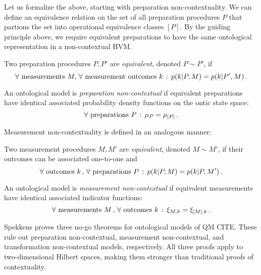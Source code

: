 Let us formalize the above, starting with preparation non-contextuality. We can define an equivalence relation on the set of all preparation procedures $P$ that partions the set into operational equivalence classes $[P]$. By the guiding principle above, we require equivalent preparations to have the same ontological representation in a non-contextual HVM.

\begin{definition}[CITE]\hfill\break
\label{def:prepnc}
Two preparation procedures $P,P'$ are \emph{equivalent}, denoted $P\sim P'$, if 
\begin{equation*}
    \forall \text{ measurements } M,\thinspace \forall \text{ measurement outcomes } k\thinspace:\thinspace p(k\vert P,M)=p(k\vert P',M)\thinspace.
\end{equation*}

An ontological model is \emph{preparation non-contextual} if equivalent preparations have identical associated probability density functions on the ontic state space: 
\begin{equation*}
    \forall \text{ preparations } P\thinspace:\thinspace \mu_{P}=\mu_{[P]}\thinspace.
\end{equation*}
\end{definition}

Measurement non-contextuality is defined in an analogous manner:

\begin{definition}[CITE]\hfill\break
\label{def:mntnc}
Two measurement procedures $M,M'$ are \emph{equivalent}, denoted $M\sim M'$, if their outcomes can be associated one-to-one and 
\begin{equation*}
    \forall \text{ outcomes } k\thinspace,\thinspace \forall \text{ preparations } P\thinspace:\thinspace p(k\vert P,M)=p(k\vert P,M')\thinspace.
\end{equation*}

An ontological model is \emph{measurement non-contextual} if equivalent measurements have identical associated indicator functions: 
\begin{equation*}
    \forall \text{ measurements } M\thinspace,\thinspace \forall \text{ outcomes } k\thinspace:\thinspace \xi_{M,k}=\xi_{[M],k}\thinspace.
\end{equation*}
\end{definition}

Spekkens proves three no-go theorems for ontological models of QM CITE. These rule out preparation non-contextual, measurement non-contextual, and transformation non-contextual models, respectively. All three proofs apply to two-dimensional Hilbert spaces, making them stronger than traditional proofs of contextuality.

